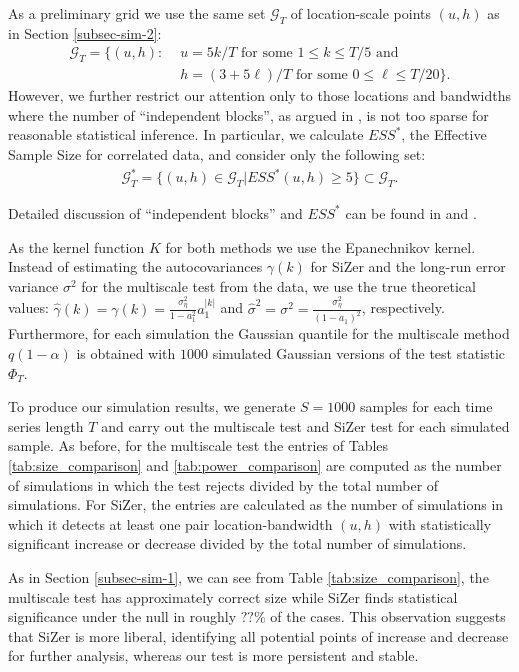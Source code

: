 \documentclass[a4paper,12pt]{article}
\begin{document}
As a preliminary grid we use the same set $\mathcal{G}_T$ of location-scale points $(u,h)$ as in Section \ref{subsec-sim-2}:
\begin{align}
\mathcal{G}_T = \big\{ (u, h): & \, \, u = 5k/T \text{ for some } 1 \le k \le T/5 \text{ and } \nonumber \\ & \, \, h = (3+5\ell)/T \text{ for some } 0 \le \ell \le T/20 \big\}.
\end{align}
However, we further restrict our attention only to those locations and bandwidths where the number of ``independent blocks'', as argued in \cite{Rondonotti2007}, is not too sparse for reasonable statistical inference. In particular, we calculate $ESS^*$, the Effective Sample Size for correlated data, and consider only the following set:
\begin{align}
\mathcal{G}_T^*  = \big\{ (u, h)\in \mathcal{G}_T| ESS^*(u, h) \geq 5\}\subset \mathcal{G}_T.
\end{align}

Detailed discussion of ``independent blocks'' and $ESS^*$ can be found in \cite{ChaudhuriMarron1999} and \cite{Rondonotti2007}. 

As the kernel function $K$ for both methods  we use the Epanechnikov kernel. Instead of estimating the autocovariances $\gamma(k)$ for SiZer and the long-run error variance $\sigma^2$ for the multiscale test from the data, we use the true theoretical values: $\widehat{\gamma}(k) = \gamma(k) = \frac{\sigma_\eta^2}{1 - a_1^2}a_1^{|k|}$ and $\widehat{\sigma}^2 = \sigma^2 = \frac{\sigma_\eta^2}{(1 - a_1)^2}$, respectively. Furthermore, for each simulation the Gaussian quantile for the multiscale method  $q(1 - \alpha)$ is obtained with $1000$ simulated Gaussian versions of the test statistic $\Phi_T$.

To produce our simulation results, we generate $S=1000$ samples for each time series length $T$ and carry out the multiscale test and SiZer test for each simulated sample. As before, for the multiscale test the entries of Tables \ref{tab:size_comparison} and \ref{tab:power_comparison} are computed as the number of simulations in which the test rejects divided by the total number of simulations. For SiZer, the entries are calculated as the number of simulations in which it detects at least one pair location-bandwidth $(u,h)$ with statistically significant increase or decrease divided by the total number of simulations.

As in Section \ref{subsec-sim-1}, we can see from Table \ref{tab:size_comparison}, the multiscale test has approximately correct size while SiZer finds statistical significance under the null in roughly $??\%$ of the cases. This observation suggests that SiZer is more liberal, identifying all potential points of increase and decrease for further analysis, whereas our test is more persistent and stable.
\end{document}
